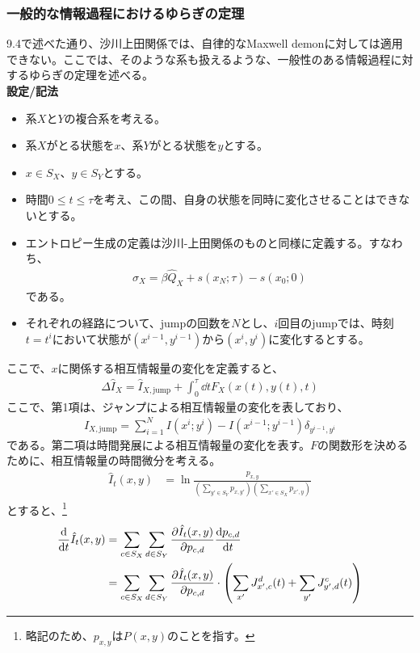 \documentclass[a4paper,11pt]{jsarticle}
\numberwithin{equation}{section}
\begin{document}
\subsubsection{一般的な情報過程におけるゆらぎの定理}
9.4で述べた通り、沙川上田関係では、自律的なMaxwell demonに対しては適用できない。ここでは、そのような系も扱えるような、一般性のある情報過程に対するゆらぎの定理を述べる。\\
\textbf{設定/記法}\\
\begin{itemize}
    \item 系$X$と$Y$の複合系を考える。
    \item 系$X$がとる状態を$x$、系$Y$がとる状態を$y$とする。
    \item $x \in S_X$、$y \in S_Y$とする。
    \item 時間$0 \leq t \leq \tau$を考え、この間、自身の状態を同時に変化させることはできないとする。
    \item エントロピー生成の定義は沙川-上田関係のものと同様に定義する。すなわち、
    \begin{align}
        \hat{\sigma}_X = \beta\hat{Q}_X + s(x_{N}; \tau) - s(x_0; 0) 
    \end{align}
    である。
    \item それぞれの経路について、jumpの回数を$N$とし、$i$回目のjumpでは、時刻$t = t^i$において状態が$(x^{i-1}, y^{i-1})$から$(x^{i}, y^{i})$に変化するとする。
\end{itemize}
ここで、$x$に関係する相互情報量の変化を定義すると、
\begin{align}
    \Delta \hat{I}_X = \hat{I}_{X,\text{jump}} + \int_{0}^{\tau} \dd t F_X(x(t), y(t), t)
\end{align}
ここで、第1項は、ジャンプによる相互情報量の変化を表しており、
\begin{align}
    \hat{I}_{X,\text{jump}} = \sum_{i=1}^{N} I(x^{i}; y^{i}) - I(x^{i-1}; y^{i-1})\delta_{y^{i-1}, y^{i}}
\end{align}
である。第二項は時間発展による相互情報量の変化を表す。$F$の関数形を決めるために、相互情報量の時間微分を考える。\\
\begin{align}
    \hat{I}_t(x,y) &= \ln \frac{p_{x,y}}{(\sum_{y' \in S_Y} p_{x,y'})(\sum_{x' \in S_X} p_{x',y})} 
\end{align}
とすると、\footnote{略記のため、$p_{x,y}$は$P(x,y)$のことを指す。}
\begin{align}
    \dv{t} \hat{I}_t(x,y) &= \sum_{c \in S_X} \sum_{d \in S_Y} \pdv{\hat{I}_t(x,y)}{p_{c,d}} \dv{p_{c,d}}{t} \\
    &= \sum_{c \in S_X} \sum_{d \in S_Y} \pdv{\hat{I}_t(x,y)}{p_{c,d}} \cdot \left( \sum_{x'} J_{x' ,c}^d(t) + \sum_{y'} J_{y',d}^c(t) \right) 
\end{align}
\end{document}

